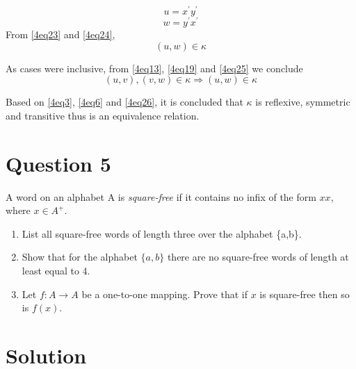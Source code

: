 \begin{itemize}
\begin{enumerate}
\begin{equation}\label{4eq23}
u = x^\prime y^\prime
\end{equation}
\begin{equation}\label{4eq24}
w = y^\prime x^\prime
\end{equation}
From \eqref{4eq23} and \eqref{4eq24},
\begin{equation}\label{4eq25}
\left( u, w \right) \in \kappa
\end{equation}
\end{enumerate}
As cases were inclusive, from \eqref{4eq13}, \eqref{4eq19} and \eqref{4eq25} we conclude
\begin{equation}\label{4eq26}
\left(u,v \right),\left(v,w\right) \in \kappa \Rightarrow \left(u,w\right) \in \kappa
\end{equation}
\end{itemize}

Based on \eqref{4eq3}, \eqref{4eq6} and \eqref{4eq26}, it is concluded that $\kappa$ is reflexive, symmetric and transitive thus is an equivalence relation.

\section{Question 5}

A word on an alphabet A is \textit{square-free} if it contains no infix of the form $xx$, where $x \in A^+$.

\begin{enumerate}[label=(\alph*)]

	\item
	List all square-free words of length three over the alphabet \{a,b\}.

	\item
	Show that for the alphabet $\{a,b\}$ there are no square-free words of length at least equal to 4.

	\item
	Let $f:A \rightarrow A$ be a one-to-one mapping.
	Prove that if $x$ is square-free then so is $f(x)$.

\end{enumerate}

\section*{Solution}

